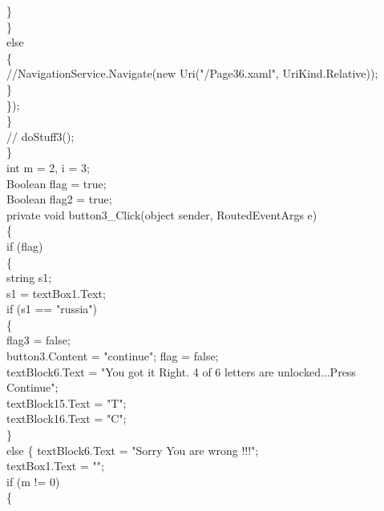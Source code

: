 {{                        \}\\
                    \}\\
                    else\\
                    \{\\
                        //NavigationService.Navigate(new Uri("/Page36.xaml", UriKind.Relative));\\
                    \}\\
                \});\\
            \}\\
            //    doStuff3();\\
        \}\\
        int m = 2, i = 3;\\
        Boolean flag = true;\\
        Boolean flag2 = true;\\
        private void button3_Click(object sender, RoutedEventArgs e)\\
        \{\\
            if (flag)\\
            \{\\
                string s1;\\
                s1 = textBox1.Text;\\
                if (s1 == "russia")\\
                \{\\
                    flag3 = false;\\
                    button3.Content = "continue"; flag = false;\\
                    textBlock6.Text = "You got it Right. 4 of 6 letters are unlocked...Press Continue";\\
                    textBlock15.Text = "T";\\
                    textBlock16.Text = "C";\\
                \}\\
                else
                \{
                    textBlock6.Text = "Sorry You are wrong !!!";\\
                    textBox1.Text = "";\\
                    if (m != 0)\\
                    \{

}}
